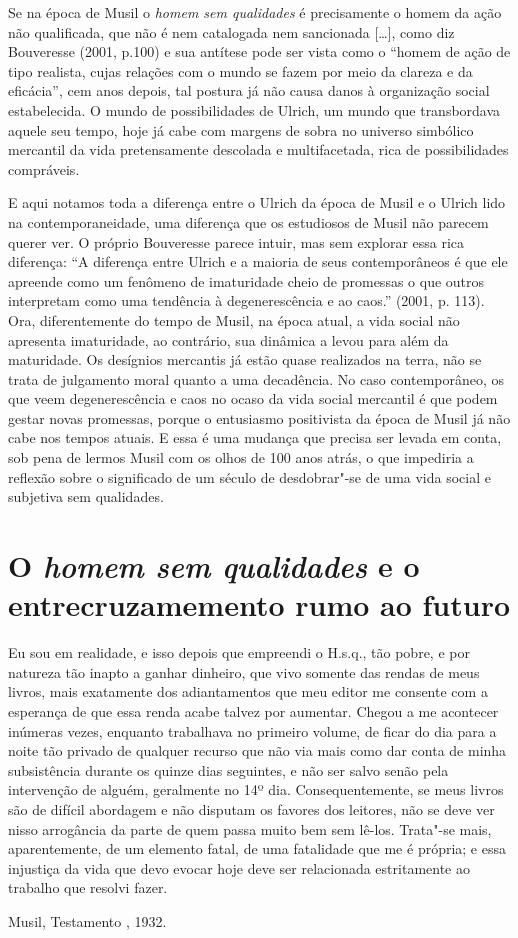 Se na época de Musil o \emph{homem sem qualidades} é precisamente o
homem da ação não qualificada, que não é nem catalogada nem sancionada
[\ldots{}], como diz Bouveresse (2001, p.100) e sua antítese pode
ser vista como o ``homem de ação de tipo realista, cujas relações com o
mundo se fazem por meio da clareza e da eficácia'', cem anos depois, tal
postura já não causa danos à organização social estabelecida. O mundo de
possibilidades de Ulrich, um mundo que transbordava aquele seu tempo,
hoje já cabe com margens de sobra no universo simbólico mercantil da
vida pretensamente descolada e multifacetada, rica de possibilidades
compráveis.

E aqui notamos toda a diferença entre o Ulrich da época de Musil e o
Ulrich lido na contemporaneidade, uma diferença que os estudiosos de Musil
não parecem querer ver. O próprio Bouveresse parece intuir, mas sem
explorar essa rica diferença: ``A diferença entre Ulrich e a maioria de
seus contemporâneos é que ele apreende como um fenômeno de imaturidade
cheio de promessas o que outros interpretam como uma tendência à
degenerescência e ao caos.'' (2001, p. 113). Ora, diferentemente do
tempo de Musil, na época atual, a vida social não apresenta imaturidade,
ao contrário, sua dinâmica a levou para além da maturidade. Os desígnios
mercantis já estão quase realizados na terra, não se trata de julgamento
moral quanto a uma decadência. No caso contemporâneo, os que veem
degenerescência e caos no ocaso da vida social mercantil é que podem
gestar novas promessas, porque o entusiasmo positivista da época de
Musil já não cabe nos tempos atuais. E essa é uma mudança que precisa
ser levada em conta, sob pena de lermos Musil com os olhos de 100 anos
atrás, o que impediria a reflexão sobre o significado de um século de
desdobrar"-se de uma vida social e subjetiva sem qualidades.

\section{O \emph{homem sem qualidades} e o entrecruzamemento rumo ao futuro}

\epigraph{Eu sou em realidade, e isso depois que empreendi o H.s.q., tão pobre, e
por natureza tão inapto a ganhar dinheiro, que vivo somente das rendas
de meus livros, mais exatamente dos adiantamentos que meu editor me
consente com a esperança de que essa renda acabe talvez por aumentar.
Chegou a me acontecer inúmeras vezes, enquanto trabalhava no primeiro
volume, de ficar do dia para a noite tão privado de qualquer recurso que
não via mais como dar conta de minha subsistência durante os quinze dias
seguintes, e não ser salvo senão pela intervenção de alguém, geralmente
no 14º dia. Consequentemente, se meus livros são de difícil abordagem e
não disputam os favores dos leitores, não se deve ver nisso arrogância
da parte de quem passa muito bem sem lê-los. Trata"-se mais,
aparentemente, de um elemento fatal, de uma fatalidade que me é própria;
e essa injustiça da vida que devo evocar hoje deve ser relacionada
estritamente ao trabalho que resolvi fazer.}{Musil, Testamento , 1932.}


